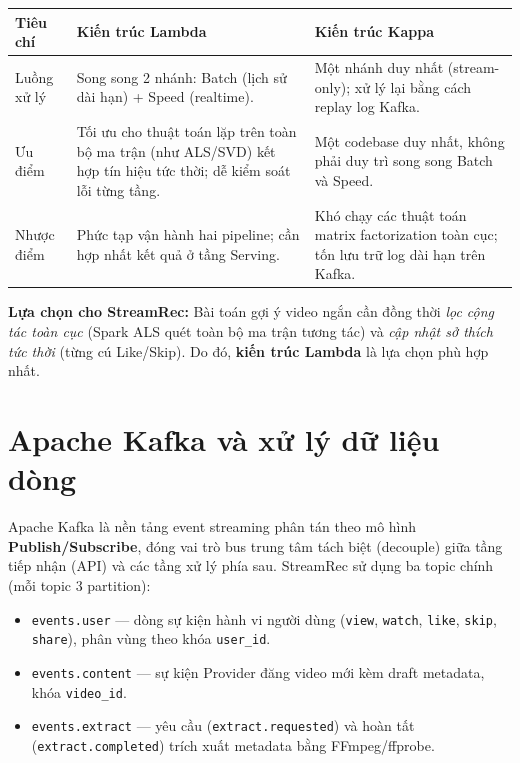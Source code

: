 \begin{center}
{\small\SingleSpacing
\renewcommand{\arraystretch}{1.12}
\begin{tabularx}{\textwidth}{@{}>{\raggedright\arraybackslash}p{2.6cm}>{\raggedright\arraybackslash}X>{\raggedright\arraybackslash}X@{}}
\toprule
Tiêu chí & Kiến trúc Lambda & Kiến trúc Kappa \\
\midrule
Luồng xử lý & Song song 2 nhánh: Batch (lịch sử dài hạn) + Speed (realtime). & Một nhánh duy nhất (stream-only); xử lý lại bằng cách replay log Kafka. \\
Ưu điểm & Tối ưu cho thuật toán lặp trên toàn bộ ma trận (như ALS/SVD) kết hợp tín hiệu tức thời; dễ kiểm soát lỗi từng tầng. & Một codebase duy nhất, không phải duy trì song song Batch và Speed. \\
Nhược điểm & Phức tạp vận hành hai pipeline; cần hợp nhất kết quả ở tầng Serving. & Khó chạy các thuật toán matrix factorization toàn cục; tốn lưu trữ log dài hạn trên Kafka. \\
\bottomrule
\end{tabularx}}
\end{center}

\textbf{Lựa chọn cho StreamRec:} Bài toán gợi ý video ngắn cần đồng thời \emph{lọc cộng tác toàn cục} (Spark ALS quét toàn bộ ma trận tương tác) và \emph{cập nhật sở thích tức thời} (từng cú Like/Skip). Do đó, \textbf{kiến trúc Lambda} là lựa chọn phù hợp nhất.


\section{Apache Kafka và xử lý dữ liệu dòng}

Apache Kafka là nền tảng event streaming phân tán theo mô hình \textbf{Publish/Subscribe}, đóng vai trò bus trung tâm tách biệt (decouple) giữa tầng tiếp nhận (API) và các tầng xử lý phía sau. StreamRec sử dụng ba topic chính (mỗi topic 3 partition):

\begin{itemize}
  \item \texttt{events.user} --- dòng sự kiện hành vi người dùng (\texttt{view}, \texttt{watch}, \texttt{like}, \texttt{skip}, \texttt{share}), phân vùng theo khóa \texttt{user\_id}.
  \item \texttt{events.content} --- sự kiện Provider đăng video mới kèm draft metadata, khóa \texttt{video\_id}.
  \item \texttt{events.extract} --- yêu cầu (\texttt{extract.requested}) và hoàn tất (\texttt{extract.completed}) trích xuất metadata bằng FFmpeg/ffprobe.
\end{itemize}

